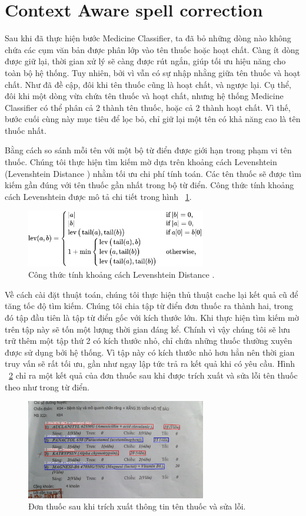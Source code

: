 \section{Context Aware spell correction}

Sau khi đã thực hiện bước Medicine Classifier, ta đã bỏ những dòng nào không chứa các cụm văn bản được phân lớp vào tên thuốc hoặc hoạt chất. Càng ít dòng được giữ lại, thời gian xử lý sẽ càng được rút ngắn, giúp tối ưu hiệu năng cho toàn bộ hệ thống. Tuy nhiên, bởi vì vẫn có sự nhập nhằng giữa tên thuốc và hoạt chất. Như đã đề cập, đôi khi tên thuốc cũng là hoạt chất, và ngược lại. Cụ thể, đôi khi một dòng vừa chứa tên thuốc và hoạt chất, nhưng hệ thống Medicine Classifier có thể phân cả 2 thành tên thuốc, hoặc cả 2 thành hoạt chất. Vì thế, bước cuối cùng này mục tiêu để lọc bỏ, chỉ giữ lại một tên có khả năng cao là tên thuốc nhất.

Bằng cách so sánh mỗi tên với một bộ từ điển được giới hạn trong phạm vi tên thuốc. Chúng tôi thực hiện tìm kiếm mờ dựa trên khoảng cách Levenshtein (Levenshtein Distance \cite{Levenshtein_distance}) nhằm tối ưu chi phí tính toán. Các tên thuốc sẽ được tìm kiếm gần đúng với tên thuốc gần nhất trong bộ từ điển. Công thức tính khoảng cách Levenshtein được mô tả chi tiết trong hình ~\ref{lev_dist}.

\begin{figure}
\centering
\includegraphics[width=0.7\textwidth]{mep_img/lev_dist.png}
\caption{Công thức tính khoảng cách Levenshtein Distance \cite{Levenshtein_distance}.}\label{lev_dist}
\end{figure}

Về cách cài đặt thuật toán, chúng tôi thực hiện thủ thuật cache lại kết quả cũ để tăng tốc độ tìm kiếm. Chúng tôi chia tập từ điển đơn thuốc ra thành hai, trong đó tập đầu tiên là tập từ điển gốc với kích thước lớn. Khi thực hiện tìm kiếm mờ trên tập này sẽ tốn một lượng thời gian đáng kể. Chính vì vậy chúng tôi sẽ lưu trữ thêm một tập thứ 2 có kích thước nhỏ, chỉ chứa những thuốc thường xuyên được sử dụng bởi hệ thống. Vì tập này có kích thước nhỏ hơn hẳn nên thời gian truy vấn sẽ rất tối ưu, gần như ngay lập tức trả ra kết quả khi có yêu cầu. Hình ~\ref{med_recorrected} chỉ ra một kết quả của đơn thuốc sau khi được trích xuất và sửa lỗi tên thuốc theo như trong từ điển.

\begin{figure}
\centering
\includegraphics[width=0.7\textwidth]{mep_img/med_recorrected.png}
\caption{Đơn thuốc sau khi trích xuất thông tin tên thuốc và sửa lỗi.}\label{med_recorrected}
\end{figure}